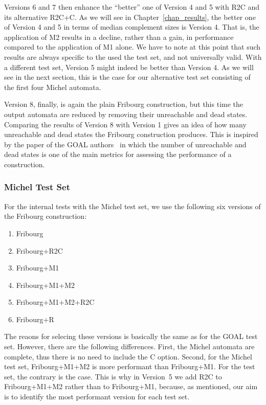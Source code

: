 Versions 6 and 7 then enhance the ``better'' one of Version 4 and 5 with R2C and its alternative R2C+C. As we will see in Chapter~\ref{chap_results}, the better one of Version 4 and 5 in terms of median complement sizes is Version 4. That is, the application of M2 results in a decline, rather than a gain, in performance compared to the application of M1 alone. We have to note at this point that such results are always specific to the used the test set, and not universally valid. With a different test set, Version 5 might indeed be better than Version 4. As we will see in the next section, this is the case for our alternative test set consisting of the first four Michel automata.

Version 8, finally, is again the plain Fribourg construction, but this time the output automata are reduced by removing their unreachable and dead states. Comparing the results of Version 8 with Version 1 gives an idea of how many unreachable and dead states the Fribourg construction produces. This is inspired by the paper of the GOAL authors~\cite{2011_tsai} in which the number of unreachable and dead states is one of the main metrics for assessing the performance of a construction.

\subsubsection{Michel Test Set}
For the internal tests with the Michel test set, we use the following six versions of the Fribourg construction:
\begin{enumerate}
\item Fribourg
\item Fribourg+R2C
\item Fribourg+M1
\item Fribourg+M1+M2
\item Fribourg+M1+M2+R2C
\item Fribourg+R
\end{enumerate}

The reaons for selecing these versions is basically the same as for the GOAL test set. However, there are the following differences. First, the Michel automata are complete, thus there is no need to include the C option. Second, for the Michel test set, Fribourg+M1+M2 is more performant than Fribourg+M1. For the \goal{} test set, the contrary is the case. This is why in Version~5 we add R2C to Fribourg+M1+M2 rather than to Fribourg+M1, because, as mentioned, our aim is to identify the most performant version for each test set.


